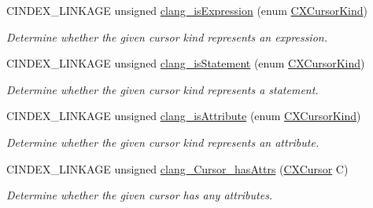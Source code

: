 \begin{DoxyCompactItemize}
C\+I\+N\+D\+E\+X\+\_\+\+L\+I\+N\+K\+A\+GE unsigned \hyperlink{group__CINDEX__CURSOR__MANIP_ga8e537f2f251a92a799d6cc8459614d42}{clang\+\_\+is\+Expression} (enum \hyperlink{group__CINDEX_gaaccc432245b4cd9f2d470913f9ef0013}{C\+X\+Cursor\+Kind})
\begin{DoxyCompactList}\small\item\em Determine whether the given cursor kind represents an expression. \end{DoxyCompactList}\item 
\mbox{\label{group__CINDEX__CURSOR__MANIP_ga33c9d1d9cf46a316160f68356608773a}} 
C\+I\+N\+D\+E\+X\+\_\+\+L\+I\+N\+K\+A\+GE unsigned \hyperlink{group__CINDEX__CURSOR__MANIP_ga33c9d1d9cf46a316160f68356608773a}{clang\+\_\+is\+Statement} (enum \hyperlink{group__CINDEX_gaaccc432245b4cd9f2d470913f9ef0013}{C\+X\+Cursor\+Kind})
\begin{DoxyCompactList}\small\item\em Determine whether the given cursor kind represents a statement. \end{DoxyCompactList}\item 
\mbox{\label{group__CINDEX__CURSOR__MANIP_ga204227c8c254c568ef6d577ffcf8d3e5}} 
C\+I\+N\+D\+E\+X\+\_\+\+L\+I\+N\+K\+A\+GE unsigned \hyperlink{group__CINDEX__CURSOR__MANIP_ga204227c8c254c568ef6d577ffcf8d3e5}{clang\+\_\+is\+Attribute} (enum \hyperlink{group__CINDEX_gaaccc432245b4cd9f2d470913f9ef0013}{C\+X\+Cursor\+Kind})
\begin{DoxyCompactList}\small\item\em Determine whether the given cursor kind represents an attribute. \end{DoxyCompactList}\item 
\mbox{\label{group__CINDEX__CURSOR__MANIP_ga2bcf84ce3d5158457451e051afbdc8dd}} 
C\+I\+N\+D\+E\+X\+\_\+\+L\+I\+N\+K\+A\+GE unsigned \hyperlink{group__CINDEX__CURSOR__MANIP_ga2bcf84ce3d5158457451e051afbdc8dd}{clang\+\_\+\+Cursor\+\_\+has\+Attrs} (\hyperlink{structCXCursor}{C\+X\+Cursor} C)
\begin{DoxyCompactList}\small\item\em Determine whether the given cursor has any attributes. \end{DoxyCompactList}\item 
\mbox{\label{group__CINDEX__CURSOR__MANIP_ga86d525c70189f9d04caf5aa59121c384}} 

\end{DoxyCompactItemize}
